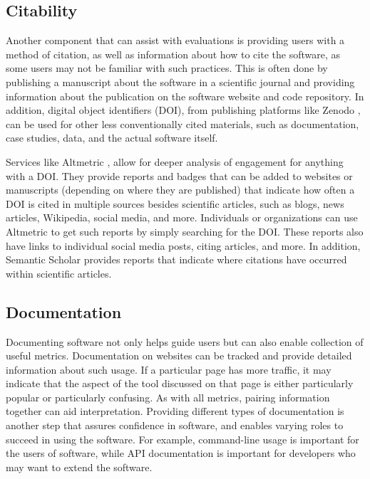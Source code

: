 \documentclass{article}
\begin{document}
\subsection{Citability}
Another component that can assist with evaluations is providing users with a method of citation, as well as information about how to cite the software, as some users may not be familiar with such practices. This is often done by publishing a manuscript about the software in a scientific journal and providing information about the publication on the software website and code repository. In addition, digital object identifiers (DOI), from publishing platforms like Zenodo \cite{zenodo}, can be used for other less conventionally cited materials, such as documentation, case studies, data, and the actual software itself.

Services like Altmetric \cite{noauthor_altmetric_2015}, allow for deeper analysis of engagement for anything with a DOI. They provide reports and badges that can be added to websites or manuscripts (depending on where they are published) that indicate how often a DOI is cited in multiple sources besides scientific articles, such as blogs, news articles, Wikipedia, social media, and more.  Individuals or organizations can use Altmetric to get such reports by simply searching for the DOI. These reports also have links to individual social media posts, citing articles, and more. In addition, Semantic Scholar  \cite{noauthor_semantic_nodate} provides reports that indicate where citations have occurred within scientific articles. 


\subsection{Documentation}
Documenting software not only helps guide users but can also enable collection of useful metrics.  Documentation on websites can be tracked and provide detailed information about such usage. If a particular page has more traffic, it may indicate that the aspect of the tool discussed on that page is either particularly popular or particularly confusing. As with all metrics, pairing information together can aid interpretation. Providing different types of documentation is another step that assures confidence in software, and enables varying roles to succeed in using the software. For example, command-line usage is important for the users of software, while API documentation is important for developers who may want to extend the software.
\end{document}
